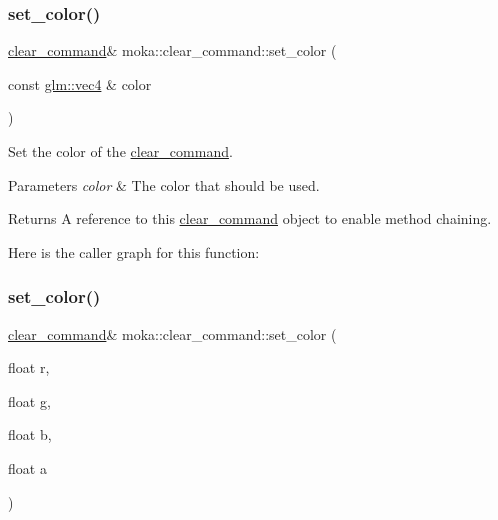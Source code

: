 \subsubsection{\texorpdfstring{set\_color()}{set\_color()}\hspace{0.1cm}{\footnotesize\ttfamily [1/2]}}
{\footnotesize\ttfamily \mbox{\hyperlink{classmoka_1_1clear__command}{clear\+\_\+command}}\& moka\+::clear\+\_\+command\+::set\+\_\+color (\begin{DoxyParamCaption}\item[{const \mbox{\hyperlink{namespacemoka_aed2224bc0e5b79e57a8975ded94ee1aaa1a9028fd802c481a99491a418ca2fe86}{glm\+::vec4}} \&}]{color }\end{DoxyParamCaption})}



Set the color of the \mbox{\hyperlink{classmoka_1_1clear__command}{clear\+\_\+command}}. 


\begin{DoxyParams}{Parameters}
{\em color} & The color that should be used. \\
\hline
\end{DoxyParams}
\begin{DoxyReturn}{Returns}
A reference to this \mbox{\hyperlink{classmoka_1_1clear__command}{clear\+\_\+command}} object to enable method chaining. 
\end{DoxyReturn}
Here is the caller graph for this function\+:
\mbox{\label{classmoka_1_1clear__command_a3a7771ccad1fda309a857617687d81a6}} 
\subsubsection{\texorpdfstring{set\_color()}{set\_color()}\hspace{0.1cm}{\footnotesize\ttfamily [2/2]}}
{\footnotesize\ttfamily \mbox{\hyperlink{classmoka_1_1clear__command}{clear\+\_\+command}}\& moka\+::clear\+\_\+command\+::set\+\_\+color (\begin{DoxyParamCaption}\item[{float}]{r,  }\item[{float}]{g,  }\item[{float}]{b,  }\item[{float}]{a }\end{DoxyParamCaption})}




